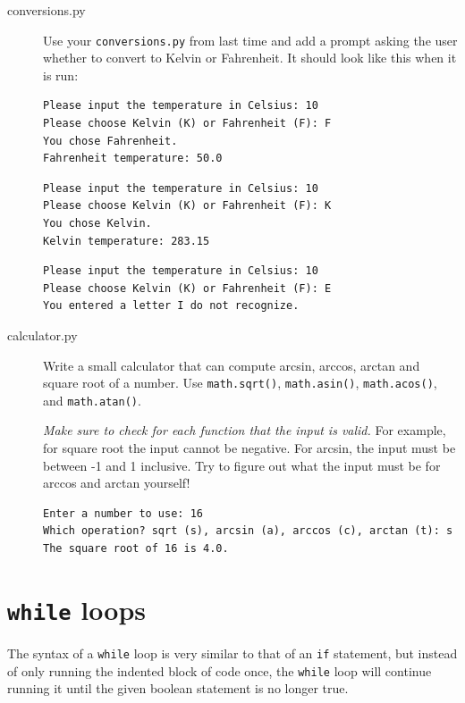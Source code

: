 \documentclass[11pt,hidelinks]{article}
\begin{document}
\begin{description}
  \item[conversions.py] Use your \texttt{conversions.py} from last time and add a
    prompt asking the user whether to convert to Kelvin or Fahrenheit. It should
    look like this when it is run:

    \begin{lstlisting}[style=bash]
Please input the temperature in Celsius: 10
Please choose Kelvin (K) or Fahrenheit (F): F
You chose Fahrenheit.
Fahrenheit temperature: 50.0
    \end{lstlisting}
    \begin{lstlisting}[style=bash]
Please input the temperature in Celsius: 10
Please choose Kelvin (K) or Fahrenheit (F): K
You chose Kelvin.
Kelvin temperature: 283.15
    \end{lstlisting}
    \begin{lstlisting}[style=bash]
Please input the temperature in Celsius: 10
Please choose Kelvin (K) or Fahrenheit (F): E
You entered a letter I do not recognize.
    \end{lstlisting}

  \item[calculator.py] Write a small calculator that can compute arcsin, arccos,
    arctan and square root of a number. Use \lstinline!math.sqrt()!,
    \lstinline!math.asin()!, \lstinline!math.acos()!, and
    \lstinline!math.atan()!.

    \emph{Make sure to check for each function that the input is valid.} For
    example, for square root the input cannot be negative. For arcsin, the input
    must be between -1 and 1 inclusive. Try to figure out what the input must be
    for arccos and arctan yourself!

    \begin{lstlisting}[style=bash]
Enter a number to use: 16
Which operation? sqrt (s), arcsin (a), arccos (c), arctan (t): s
The square root of 16 is 4.0.
    \end{lstlisting}

\end{description}

\pagebreak
\section{\lstinline{while} loops}
The syntax of a \lstinline{while} loop is very similar to that of an
\lstinline{if} statement, but instead of only running the indented block of code
once, the \lstinline{while} loop will continue running it until the given
boolean statement is no longer true.
\end{document}
